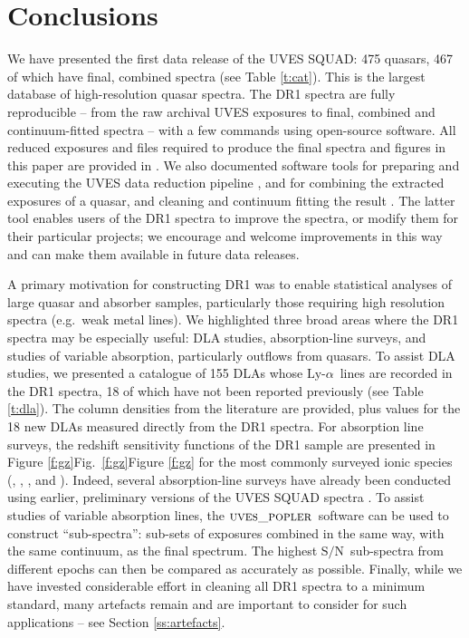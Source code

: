 \documentclass[fleqn,usenatbib,usedcolumn]{mnras}
\newcommand{\Sref}[1]{Section \ref{#1}}
\newcommand{\Tref}[1]{Table \ref{#1}}
\newcommand{\Fref}[1]{\ifhmode \ifnum\spacefactor=1001 Figure \ref{#1}\else Fig.\ \ref{#1}\fi \else Figure \ref{#1}\fi}
\newcommand{\SN}{\ensuremath{\textrm{S/N}}}
\newcommand{\lya}{\ensuremath{\textrm{Ly-}\alpha}}
\newcommand{\headsort}{\ensuremath{\textsc{uves\_headsort}}}
\newcommand{\popler}{\ensuremath{\textsc{uves\_popler}}}
\begin{document}
\section{Conclusions}\label{s:conclusion}

We have presented the first data release of the UVES SQUAD: 475 quasars, 467 of which have final, combined spectra (see \Tref{t:cat}). This is the largest database of high-resolution quasar spectra. The DR1 spectra are fully reproducible -- from the raw archival UVES exposures to final, combined and continuum-fitted spectra -- with a few commands using open-source software. All reduced exposures and files required to produce the final spectra and figures in this paper are provided in \citet{Murphy:2018:UVESSQUADDR1}. We also documented software tools for preparing and executing the UVES data reduction pipeline \citep[\headsort;][]{Murphy:2016:UVESheadsort}, and for combining the extracted exposures of a quasar, and cleaning and continuum fitting the result \citep[\popler;][]{Murphy:2016:UVESpopler}. The latter tool enables users of the DR1 spectra to improve the spectra, or modify them for their particular projects; we encourage and welcome improvements in this way and can make them available in future data releases.

A primary motivation for constructing DR1 was to enable statistical analyses of large quasar and absorber samples, particularly those requiring high resolution spectra (e.g.\ weak metal lines). We highlighted three broad areas where the DR1 spectra may be especially useful: DLA studies, absorption-line surveys, and studies of variable absorption, particularly outflows from quasars. To assist DLA studies, we presented a catalogue of 155 DLAs whose \lya\ lines are recorded in the DR1 spectra, 18 of which have not been reported previously (see \Tref{t:dla}). The  column densities from the literature are provided, plus values for the 18 new DLAs measured directly from the DR1 spectra. For absorption line surveys, the redshift sensitivity functions of the DR1 sample are presented in \Fref{f:gz} for the most commonly surveyed ionic species (, , ,  and ). Indeed, several absorption-line surveys have already been conducted using earlier, preliminary versions of the UVES SQUAD spectra \citep[e.g.][]{Richter:2011:A12,BenBekhti:2012:A110,Nielsen:2013:114,Mas-Ribas:2018:50,Mathes:2018}. To assist studies of variable absorption lines, the \popler\ software can be used to construct ``sub-spectra'': sub-sets of exposures combined in the same way, with the same continuum, as the final spectrum. The highest \SN\ sub-spectra from different epochs can then be compared as accurately as possible. Finally, while we have invested considerable effort in cleaning all DR1 spectra to a minimum standard, many artefacts remain and are important to consider for such applications -- see \Sref{ss:artefacts}.
\end{document}
